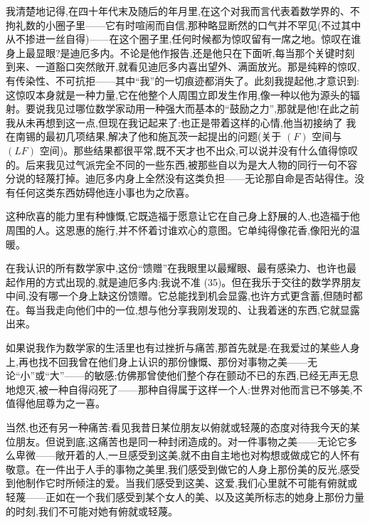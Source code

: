 我清楚地记得,在四十年代末及随后的年月里,在这个对我而言代表着数学界的、不拘礼数的小圈子里——它有时喧闹而自信,那种略显断然的口气并不罕见(不过其中从不掺进一丝自得)——在这个圈子里,任何时候都为惊叹留有一席之地。惊叹在谁身上最显眼?是迪厄多内。不论是他作报告,还是他只在下面听,每当那个关键时刻到来、一道豁口突然敞开,就看见迪厄多内喜出望外、满面放光。那是纯粹的惊叹,有传染性、不可抗拒——其中“我”的一切痕迹都消失了。此刻我提起他,才意识到:这惊叹本身就是一种力量,它在他整个人周围立即发生作用,像一种以他为源头的辐射。要说我见过哪位数学家动用一种强大而基本的“鼓励之力”,那就是他!在此之前我从未再想到这一点,但现在我记起来了:也正是带着这样的心情,他当初接纳了
 我在南锡的最初几项结果,解决了他和施瓦茨一起提出的问题(关于 $(F)$ 空间与 $(LF)$ 空间)。那些结果都很平常,既不天才也不出众,可以说并没有什么值得惊叹的。后来我见过气派完全不同的一些东西,被那些自以为是大人物的同行一句不容分说的轻蔑打掉。迪厄多内身上全然没有这类负担——无论那自命是否站得住。没有任何这类东西妨碍他连小事也为之欣喜。

 这种欣喜的能力里有种慷慨,它既造福于愿意让它在自己身上舒展的人,也造福于他周围的人。这恩惠的施行,并不怀着讨谁欢心的意图。它单纯得像花香,像阳光的温暖。

在我认识的所有数学家中,这份“馈赠”在我眼里以最耀眼、最有感染力、也许也最起作用的方式出现的,就是迪厄多内;我说不准 (35)。但在我乐于交往的数学界朋友中间,没有哪一个身上缺这份馈赠。它总能找到机会显露,也许方式更含蓄,但随时都在。每当我走向他们中的一位,想与他分享我刚发现的、让我着迷的东西,它就显露出来。

如果说我作为数学家的生活里也有过挫折与痛苦,那首先就是:在我爱过的某些人身上,再也找不回我曾在他们身上认识的那份慷慨、那份对事物之美——无论“小”或“大”——的敏感;仿佛那曾使他们整个存在颤动不已的东西,已经无声无息地熄灭,被一种自得闷死了——那种自得属于这样一个人:世界对他而言已不够美,不值得他屈尊为之一喜。

当然,也还有另一种痛苦:看见我昔日某位朋友以俯就或轻蔑的态度对待我今天的某位朋友。但说到底,这痛苦也是同一种封闭造成的。对一件事物之美——无论它多么卑微——敞开着的人,一旦感受到这美,就不由自主地也对构想或做成它的人怀有敬意。在一件出于人手的事物之美里,我们感受到做它的人身上那份美的反光,感受到他制作它时所倾注的爱。当我们感受到这美、这爱,我们心里就不可能有俯就或轻蔑——正如在一个我们感受到某个女人的美、以及这美所标志的她身上那份力量的时刻,我们不可能对她有俯就或轻蔑。

